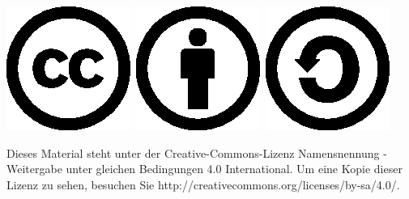 \begin{flushleft}
\includegraphics[scale=0.3]{0-Template/cc.eps}~\includegraphics[scale=0.3]{0-Template/by.eps}~\includegraphics[scale=0.3]{0-Template/sa.eps}

\vspace{0.1cm}

Dieses Material steht unter der Creative-Commons-Lizenz Namensnennung - Weitergabe unter gleichen Bedingungen 4.0 International. Um eine Kopie dieser Lizenz zu sehen, besuchen Sie http://creativecommons.org/licenses/by-sa/4.0/.
\end{flushleft}